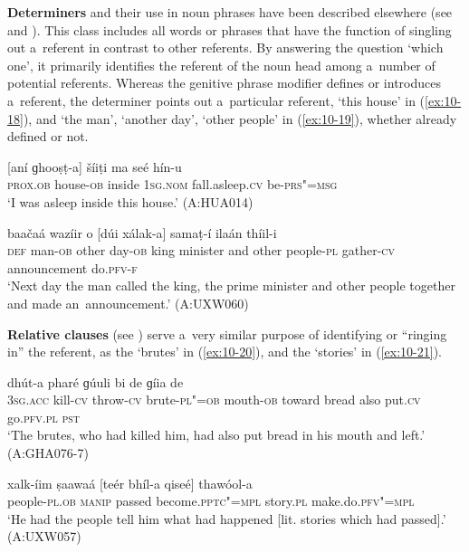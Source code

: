 \textbf{Determiners} and their use in noun phrases have been described elsewhere (see  and ). This class includes all words or phrases that have the function of singling out a~referent in contrast to other referents. By answering the question `which one', it primarily identifies the referent of the noun head among a~number of potential referents. Whereas the genitive phrase modifier defines or introduces a~referent, the determiner points out a~particular referent, `this house' in (\ref{ex:10-18}), and `the man', `another day', `other people' in (\ref{ex:10-19}), whether already defined or not.

\begin{exe}
\ex
\label{ex:10-18}
\gll \textup{[aní} \textup{ɡhooṣṭ-a]} \textup{šíiṭi} \textup{ma} \textup{seé} \textup{hín-u} \\
\textsc{prox.ob} house-\textsc{ob} inside \textsc{1sg.nom} fall.asleep.\textsc{cv} be-\textsc{prs"=msg} \\
\glt `I was asleep inside this house.' (A:HUA014)

\ex
\label{ex:10-19}
 baačaá wazíir o [dúi xálak-a] samaṭ-í ilaán thíil-i \\
\textsc{def} man-\textsc{ob} other day-\textsc{ob} king minister and other  people-\textsc{pl} gather-\textsc{cv} announcement do.\textsc{pfv-f}  \\
\glt `Next day the man called the king, the prime minister and other people together and made an~announcement.' (A:UXW060)
\end{exe}

\textbf{Relative clauses} (see ) serve a~very similar purpose of identifying or ``ringing in''
the referent, as the `brutes' in (\ref{ex:10-20}), and the `stories' in (\ref{ex:10-21}).

\begin{exe}
\ex
\label{ex:10-20}
\gll [tas mheer-í ɡal-í zaalim"=aan-óom] dhút-a pharé ɡúuli bi de ɡíia de \\
\textsc{3sg.acc} kill-\textsc{cv} throw-\textsc{cv} brute-\textsc{pl"=ob} mouth-\textsc{ob} toward  bread also put.\textsc{cv} go.\textsc{pfv.pl} \textsc{pst} \\
\glt `The brutes, who had killed him, had also put bread in his mouth and left.' (A:GHA076-7)

\ex
\label{ex:10-21}
\gll xalk-íim ṣaawaá [teér bhíl-a qiseé] thawóol-a \\
people-\textsc{pl.ob} \textsc{manip} passed become.\textsc{pptc"=mpl} story.\textsc{pl} make.do.\textsc{pfv"=mpl} \\
\glt `He had the people tell him what had happened [lit. stories which had passed].' (A:UXW057)
\end{exe}


